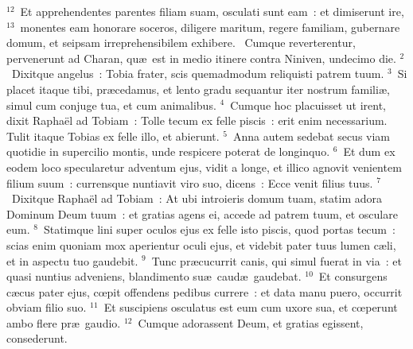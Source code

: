 ${}^{12}$~Et apprehendentes parentes filiam suam, osculati sunt eam~: et dimiserunt ire,
${}^{13}$~monentes eam honorare soceros, diligere maritum, regere familiam, gubernare domum, et seipsam irreprehensibilem exhibere.
~\lettrine[lines=10,image=true,loversize=0.05,lraise=-0.03]{C}{}umque reverterentur, pervenerunt ad Charan, qu\ae\ est in medio itinere contra Niniven, undecimo die.
${}^{2}$~Dixitque angelus~: Tobia frater, scis quemadmodum reliquisti patrem tuum.
${}^{3}$~Si placet itaque tibi, pr\ae cedamus, et lento gradu sequantur iter nostrum famili\ae , simul cum conjuge tua, et cum animalibus.
${}^{4}$~Cumque hoc placuisset ut irent, dixit Rapha\"el ad Tobiam~: Tolle tecum ex felle piscis~: erit enim necessarium. Tulit itaque Tobias ex felle illo, et abierunt.
${}^{5}$~Anna autem sedebat secus viam quotidie in supercilio montis, unde respicere poterat de longinquo.
${}^{6}$~Et dum ex eodem loco specularetur adventum ejus, vidit a longe, et illico agnovit venientem filium suum~: currensque nuntiavit viro suo, dicens~: Ecce venit filius tuus.
${}^{7}$~Dixitque Rapha\"el ad Tobiam~: At ubi introieris domum tuam, statim adora Dominum Deum tuum~: et gratias agens ei, accede ad patrem tuum, et osculare eum.
${}^{8}$~Statimque lini super oculos ejus ex felle isto piscis, quod portas tecum~: scias enim quoniam mox aperientur oculi ejus, et videbit pater tuus lumen c\ae li, et in aspectu tuo gaudebit.
${}^{9}$~Tunc pr\ae cucurrit canis, qui simul fuerat in via~: et quasi nuntius adveniens, blandimento su\ae\ caud\ae\ gaudebat.
${}^{10}$~Et consurgens c\ae cus pater ejus, cœpit offendens pedibus currere~: et data manu puero, occurrit obviam filio suo.
${}^{11}$~Et suscipiens osculatus est eum cum uxore sua, et cœperunt ambo flere pr\ae\ gaudio.
${}^{12}$~Cumque adorassent Deum, et gratias egissent, consederunt.


